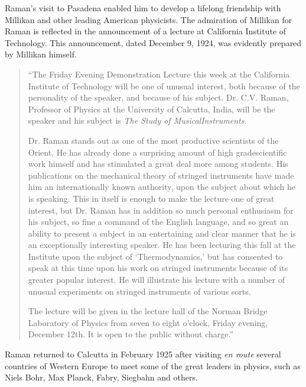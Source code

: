 Raman's visit to Pasadena enabled him to develop a lifelong 
friendship with Millikan and other leading American
physicists. The admiration of Millikan for Raman is reflected
in the announcement of a lecture at California Institute of
Technology. This announcement, dated December 9, 1924, was
evidently prepared by Millikan himself.
\begin{quote}
{\fontsize{10pt}{12pt}\selectfont
``The Friday Evening Demonstration Lecture this week at
the California Institute of Technology will be one of unusual
interest, both because of the personality of the speaker, and
because of his subject. Dr. C.V. Raman, Professor of Physics at
the University of Calcutta, India, will be the speaker and his
subject is {\em The Study of Musical\break Instruments}.

Dr. Raman stands out as one of the most productive scientists
of the Orient. He has already done a surprising amount of high
grade\break scientific work himself and has stimulated a great deal more
among students. His publications on the mechanical theory of
stringed instruments have made him an internationally known
authority, upon the subject about which he is speaking. This in
itself is enough to make the lecture one of great interest, but
Dr. Raman has in addition so much personal enthusiasm for his
subject, so fine a command of the English language, and so great
an ability to present a subject in an entertaining and clear manner
that he is an exceptionally interesting speaker. He has been
lecturing this fall at the Institute upon the subject of
`Thermodynamics,' but has consented to speak at this time upon
his work on stringed instruments because of its greater popular
interest. He will illustrate his lecture with a number of unusual
experiments on stringed instruments of various sorts.

The lecture will be given in the lecture hall of the Norman
Bridge Laboratory of Physics from seven to eight o'clock, Friday
evening, December 12th. It is open to the public without charge.''
}\relax
\end{quote}

Raman returned to Calcutta in February 1925 after visiting
{\em en route} several countries of Western Europe to meet some of
the great leaders in physics, such as Niels Bohr, Max Planck,
Fabry, Siegbahn and others.

